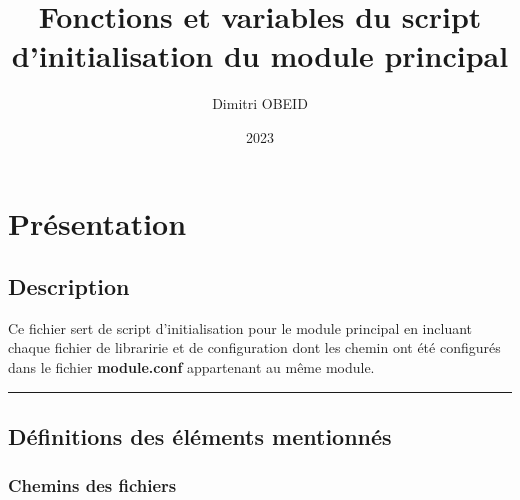 \documentclass[a4paper,10pt]{article}
\title{\color{sec1}Fonctions et variables du script \\d'initialisation du module principal}\color{text}
\author{Dimitri OBEID}
\date{2023}
\begin{document}
\maketitle
\newpage

\hypertarget{contents}{}
\tableofcontents
\newpage

\color{sec1}
\section{Présentation}\color{text}

\color{sec2}
\subsection{Description}\color{text}

\begin{justify}
    Ce fichier sert de script d'initialisation pour le module principal en incluant chaque fichier de libraririe et de configuration dont les chemin ont été configurés dans le fichier \textbf{\color{lime}module.conf} appartenant au même module.
\end{justify}




\color{sec2}\par\noindent\rule{\textwidth}{0.4pt}\color{text}

\color{sec2}
\subsection{Définitions des éléments mentionnés}\color{text}

\color{sec3}
\subsubsection{Chemins des fichiers}\color{text}
\end{document}
